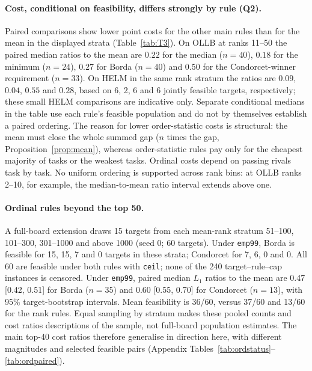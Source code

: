 \documentclass{article}
\begin{document}
\paragraph{Cost, conditional on feasibility, differs strongly by rule (Q2).}
Paired comparisons show lower point costs for the other main rules than for the mean in the displayed strata (Table~\ref{tab:T3}). On OLLB at ranks 11--50 the paired median ratios to the mean are $0.22$ for the median ($n=40$), $0.18$ for the minimum ($n=24$), $0.27$ for Borda ($n=40$) and $0.50$ for the Condorcet-winner requirement ($n=33$). On HELM in the same rank stratum the ratios are $0.09$, $0.04$, $0.55$ and $0.28$, based on 6, 2, 6 and 6 jointly feasible targets, respectively; these small HELM comparisons are indicative only. Separate conditional medians in the table use each rule's feasible population and do not by themselves establish a paired ordering. The reason for lower order-statistic costs is structural: the mean must close the whole summed gap ($n$ times the gap, Proposition~\ref{prop:mean}), whereas order-statistic rules pay only for the cheapest majority of tasks or the weakest tasks. Ordinal costs depend on passing rivals task by task. No uniform ordering is supported across rank bins: at OLLB ranks 2--10, for example, the median-to-mean ratio interval extends above one.

\paragraph{Ordinal rules beyond the top 50.}
A full-board extension draws 15 targets from each mean-rank stratum 51--100, 101--300, 301--1000 and above 1000 (seed 0; 60 targets). Under \texttt{emp99}, Borda is feasible for 15, 15, 7 and 0 targets in these strata; Condorcet for 7, 6, 0 and 0. All 60 are feasible under both rules with \texttt{ceil}; none of the 240 target--rule--cap instances is censored. Under \texttt{emp99}, paired median $L_1$ ratios to the mean are 0.47 [0.42, 0.51] for Borda ($n=35$) and 0.60 [0.55, 0.70] for Condorcet ($n=13$), with 95\% target-bootstrap intervals. Mean feasibility is 36/60, versus 37/60 and 13/60 for the rank rules. Equal sampling by stratum makes these pooled counts and cost ratios descriptions of the sample, not full-board population estimates. The main top-40 cost ratios therefore generalise in direction here, with different magnitudes and selected feasible pairs (Appendix Tables~\ref{tab:ordstatus}--\ref{tab:ordpaired}).
\end{document}
